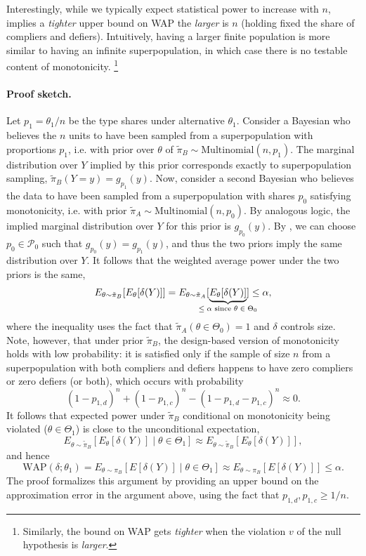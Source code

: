 \documentclass[12pt,reqno]{amsart}
\theoremstyle{theorem}
\theoremstyle{definition}
\newcommand{\0}{\mathbf{0}}
\newcommand{\1}{\mathbf{1}}
\begin{document}
Interestingly, while we typically expect statistical power to increase with $n$,
 implies a \emph{tighter} upper bound on WAP the \emph{larger} is $n$
(holding fixed the share of compliers and defiers). Intuitively, having a larger finite
population is more similar to having an infinite superpopulation, in which case there is
no testable content of monotonicity.%
\footnote{
Similarly, the bound on WAP gets \emph{tighter} when the violation $v$ of the null hypothesis is \emph{larger}.}

\paragraph{\textbf{Proof sketch.}} Let $p_1 = \theta_1/n$ be the type shares under alternative $\theta_1$. Consider a Bayesian who believes the $n$ units to have been sampled from a superpopulation with proportions $p_1$, i.e. with prior over $\theta$ of $\tilde\pi_B \sim \mathrm{Multinomial}(n,p_1)$. The marginal distribution over $Y$ implied by this prior corresponds exactly to superpopulation sampling, $\tilde\pi_B(Y{=}y) = g_{p_1}(y)$. Now, consider a second Bayesian who believes the data to have been sampled from a superpopulation with shares $p_0$ satisfying monotonicity, i.e. with prior $\tilde\pi_A \sim \mathrm{Multinomial}(n,p_0)$. By analogous logic, the implied marginal distribution over $Y$ for this prior is $g_{p_0}(y)$. By , we can choose $p_0 \in \mathcal{P}_0$ such that $g_{p_0}(y) = g_{p_1}(y)$, and thus the two priors imply the same distribution over $Y$. It follows that the weighted average power under the two priors is the same,
\[E_{\theta \sim \tilde\pi_B}[ E_\theta[\delta(Y)] ] = E_{\theta \sim \tilde\pi_A}[ \underbrace{E_\theta[\delta(Y)] }_{\mathclap{\text{$\leq \alpha$ since $\theta \in \Theta_0$}}}] \leq \alpha, \]
where the inequality uses the fact that $\tilde\pi_A(\theta \in \Theta_0) = 1$ and $\delta$ controls size. Note, however, that under prior $\tilde\pi_B$, the design-based version of monotonicity holds with low probability: it is satisfied only if the sample of size $n$ from a superpopulation with both compliers and defiers happens to have zero compliers or zero defiers (or both), which occurs with probability \[(1-p_{1,d})^n + (1-p_{1,c})^n - (1-p_{1,d}-p_{1,c})^n \approx 0.\]  It follows that expected power under $\tilde\pi_B$ conditional on monotonicity being violated ($\theta \in \Theta_1$) is close to the unconditional expectation,
\[E_{\theta \sim \tilde\pi_B}[ E_\theta[\delta(Y)] \mid \theta \in \Theta_1 ] \approx E_{\theta \sim \tilde\pi_B}[ E_\theta[\delta(Y)] ] , \] and hence
$$ \mathrm{WAP}(\delta; \theta_1) = E_{\theta \sim \pi_B}[ E[\delta(Y)] \mid \theta \in \Theta_1 ] \approx  E_{\theta \sim \pi_B}[ E[\delta(Y)]  ]  \leq \alpha. $$
The proof formalizes this argument by providing an upper bound on the approximation error in the argument above, using the fact that $p_{1,d},p_{1,c} \geq 1/n$.
\end{document}
